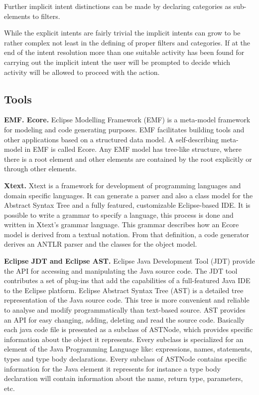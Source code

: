 Further implicit intent distinctions can be made by declaring categories as sub-elements to filters.

While the explicit intents are fairly trivial the implicit intents can grow to be rather complex not least in the defining of proper filters and categories. If at the end of the intent resolution more than one suitable activity has been found for carrying out the implicit intent the user will be prompted to decide which activity will be allowed to proceed with the action. 


\subsection{Tools}
\label{tools}
\textbf{EMF. Ecore.} Eclipse Modelling Framework (EMF) \cite{emf} is a meta-model framework for modeling and code generating purposes. EMF facilitates building tools and other applications based on a structured data model. A self-describing meta-model in EMF is called Ecore. Any EMF model has tree-like structure, where there is a root element and other elements are contained by the root explicitly or through other elements. 

\textbf{Xtext.} Xtext \cite{xtext} is a framework for development of programming languages and domain specific languages. It can generate a parser and also a class model for the Abstract Syntax Tree and a fully featured, customizable Eclipse-based IDE. It is possible to write a grammar to specify a language, this process is done and written in Xtext's grammar language. This grammar describes how an Ecore model is derived from a textual notation. From that definition, a code generator derives an ANTLR parser and the classes for the object model.

\textbf{Eclipse JDT and Eclipse AST.} Eclipse Java Development Tool (JDT) \cite{jdt} provide the API for accessing and manipulating the Java source code. The JDT tool contributes a set of plug-ins that add the capabilities of a full-featured Java IDE to the Eclipse platform. Eclipse Abstract Syntax Tree (AST) \cite{ast} is a detailed tree representation of the Java source code. This tree is more convenient and reliable to analyse and modify programmatically than text-based source. AST provides an API for easy changing, adding, deleting and read the source code. Basically each java code file is presented as a subclass of ASTNode, which provides specific information about the object it represents. Every subclass is specialized for an element of the Java Programming Language like: expressions, names, statements, types and type body declarations. Every subclass of ASTNode contains specific information for the Java element it represents for instance a type body declaration will contain information about the name, return type, parameters, etc.

